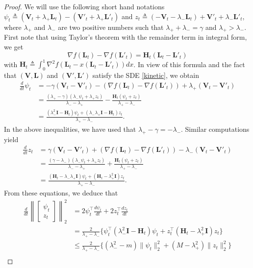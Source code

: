 \documentclass[a4paper,bej,preprint,reqno]{imsart}
\newcommand\bfH{\mathbf H}
\newcommand\bL{\boldsymbol L}
\newcommand\bV{\boldsymbol V}
\newcommand\bfI{\mathbf I}
\begin{document}
\begin{proof}
We will use the following short hand notations $\psi_t\triangleq (\bV_t+\lambda_+\bL_t)
-(\bV'_t+\lambda_+ \bL'_t)$ and $z_t\triangleq (-\bV_t-\lambda_-\bL_t)+ \bV'_t+
\lambda_-\bL'_t$, where $\lambda_+$ and $\lambda_-$ are two positive numbers such that
$\lambda_++\lambda_-=\gamma$ and $\lambda_+>\lambda_-$. First note that using Taylor's
theorem with the remainder term in integral form, we get
$$
\nabla f(\bL_t)-\nabla f(\bL'_t) = \bfH_t(\bL_t-\bL'_t)
$$
with $\bfH_t\triangleq\int_0^1\nabla^2 f(\bL_t-x(\bL_t-\bL'_t))dx$. In view of
this formula and the fact that $(\bV,\bL)$ and $(\bV',\bL')$ satisfy the SDE
\eqref{kinetic}, we obtain
\begin{align}
\frac{d}{dt} \psi_t
	&=-\gamma(\bV_t-\bV'_t) - \left(\nabla f(\bL_t)-\nabla f(\bL'_t)\right)
			+\lambda_+(\bV_t-\bV'_t)\\
	&=\frac{(\lambda_+-\gamma)(\lambda_-\psi_t+\lambda_+ z_t)}{\lambda_--\lambda_+}
	-\frac{\bfH_t(\psi_t+z_t)}{\lambda_+-\lambda_-}\\
	&= \frac{(\lambda_-^2\bfI-\bfH_t)\psi_t+(\lambda_-\lambda_+\bfI-\bfH_t)z_t}
	{\lambda_+-\lambda_-}.
\end{align}
In the above inequalities, we have used that $\lambda_+-\gamma = -\lambda_-$.
Similar computations yield
\begin{align}
\frac{d}{dt} z_t
	&=\gamma(\bV_t-\bV'_t) + \left(\nabla f(\bL_t)-\nabla f(\bL'_t)\right)
			-\lambda_-(\bV_t-\bV'_t)\\
	&=\frac{(\gamma-\lambda_-)(\lambda_-\psi_t+\lambda_+ z_t)}{\lambda_--\lambda_+}
	+\frac{\bfH_t(\psi_t+z_t)}{\lambda_+-\lambda_-}\\
	&= \frac{(\bfH_t-\lambda_-\lambda_+\bfI)\psi_t+(\bfH_t-\lambda_+^2\bfI)z_t}
	{\lambda_+-\lambda_-}.
\end{align}
From these equations, we deduce that
\begin{align}
    \frac{d}{dt}
		\left\|
		\begin{bmatrix}
     \psi_t  \\
      z_t
		\end{bmatrix}
		\right\|_2^2
				& = 2\psi_t^\top\frac{d\psi_t}{dt} + 2z_t^\top\frac{dz_t}{dt}\\
				&=\frac{2}{\lambda_+-\lambda_-}
				\Big\{ \psi_t^\top(\lambda_-^2\bfI-\bfH_t)\psi_t +
					z_t^\top(\bfH_t-\lambda_+^2\bfI)z_t\Big\}	\\			
				&\le\frac{2}{\lambda_+-\lambda_-}
				\Big\{ (\lambda_-^2-m)\|\psi_t\|_2^2 +
					(M-\lambda_+^2)\|z_t\|_2^2\Big\}\\

\end{align}
\end{proof}
\end{document}
